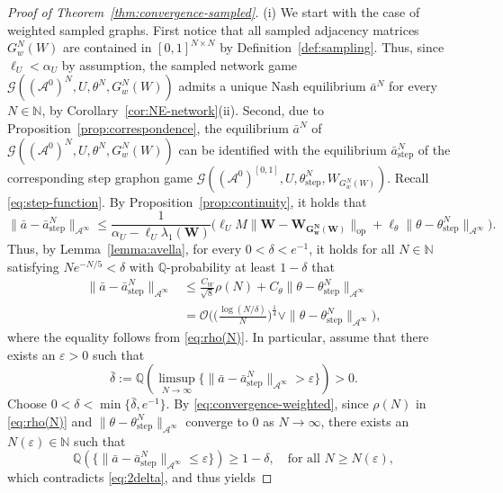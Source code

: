 \documentclass[11pt]{article}
\def\eps{\varepsilon}
\def\Q{\mathbb{Q}}
\newcommand{\N}{{\mathbb N}}
\newcommand{\be}{\begin{equation}}
\newcommand{\ee}{\end{equation}}
\newcommand{\dl}{\delta}
\numberwithin{equation}{section}
\begin{document}
\begin{proof}[Proof of Theorem~\ref{thm:convergence-sampled}]
(i) We start with the case of weighted sampled graphs. First notice that all sampled adjacency matrices  $G_w^N(W)$ are contained in $[0,1]^{N\times N}$ by Definition~\ref{def:sampling}. Thus, since $\ell_U<\alpha_U$ by assumption, the sampled network game $\mathcal{G}((\mathcal{A}^0)^N,U,\theta^N,G_w^N(W))$ admits a unique Nash equilibrium $\bar a^N$ for every $N\in\N$, by Corollary~\ref{cor:NE-network}(ii). Second, due to Proposition~\ref{prop:correspondence}, the equilibrium $\bar a^N$ of $\mathcal{G}((\mathcal{A}^0)^N,U,\theta^N,G_w^N(W))$ can be identified with the equilibrium $\bar a^N_{\operatorname{step}}$ of the corresponding step graphon game $\mathcal{G}((\mathcal{A}^0)^{[0,1]},U,\theta^N_{\operatorname{step}},W_{G_w^N(W)})$. Recall \eqref{eq:step-function}. By Proposition~\ref{prop:continuity}, it holds that
\be
    \|\bar a-\bar a^N_{\operatorname{step}}\|_{\mathcal{A}^\infty}\leq \frac{1}{\alpha_U-\ell_U\lambda_{1}(\boldsymbol{W})}\big(\ell_UM\|\boldsymbol{W}-\boldsymbol{W_{G_w^N(W)}}\|_{\operatorname{op}}+\ell_\theta\|\theta-\theta^N_{\operatorname{step}}\|_{\mathcal{A}^\infty}\big).
\ee
Thus, by Lemma~\ref{lemma:avella}, for every $0<\dl<e^{-1}$, it holds for all $N\in\N$ satisfying $Ne^{-N/5}<\dl$ with $\Q$-probability at least $1-\dl$ that
\be\begin{aligned}\label{eq:convergence-weighted}
    \|\bar a-\bar a^N_{\operatorname{step}}\|_{\mathcal{A}^\infty}&\leq \frac{C_W}{\sqrt{8}}\rho(N)+C_\theta\|\theta-\theta^N_{\operatorname{step}}\|_{\mathcal{A}^\infty}\\
    &=\mathcal{O}\Big(\Big(\frac{\log(N/\dl)}{N}\Big)^\frac{1}{4}\vee\|\theta-\theta^N_{\operatorname{step}}\|_{\mathcal{A}^\infty}\Big),
\end{aligned}\ee
where the equality follows from \eqref{eq:rho(N)}. In particular, assume that there exists an $\eps>0$ such that
\be\label{eq:2delta}
\bar\dl:=\Q\left(\limsup_{N\to\infty}\Big\{\|\bar a-\bar a^N_{\operatorname{step}}\|_{\mathcal{A}^\infty}>\eps\Big\}\right)>0.
\ee
Choose $0<\dl<\min\{\bar\dl,e^{-1}\}$. By \eqref{eq:convergence-weighted}, since $\rho(N)$ in \eqref{eq:rho(N)} and $\|\theta-\theta^N_{\operatorname{step}}\|_{\mathcal{A}^\infty}$ converge to 0 as $N\to\infty$, there exists an $N(\eps)\in\N$ such that
\be
\Q\left(\Big\{\|\bar a-\bar a^N_{\operatorname{step}}\|_{\mathcal{A}^\infty}\leq\eps\Big\}\right)\geq 1-\dl,\quad \textrm{for all }N\geq N(\eps),
\ee
which contradicts \eqref{eq:2delta}, and thus yields

\end{proof}
\end{document}
